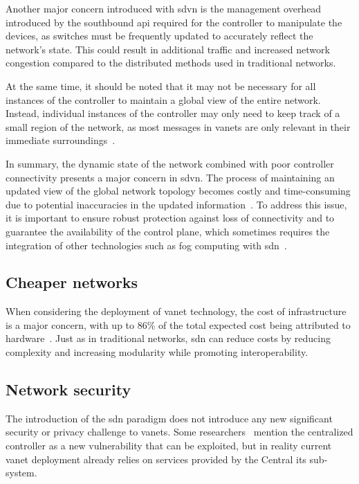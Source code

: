 Another major concern introduced with \gls{sdvn} is the management overhead introduced by the southbound \gls{api} required for the controller to manipulate the devices, as switches must be frequently updated to accurately reflect the network's state. This could result in additional traffic and increased network congestion compared to the distributed methods used in traditional networks.

At the same time, it should be noted that it may not be necessary for all instances of the controller to maintain a global view of the entire network. Instead, individual instances of the controller may only need to keep track of a small region of the network, as most messages in \glspl{vanet} are only relevant in their immediate surroundings~\cite{sarpong_potential_2023}.

In summary, the dynamic state of the network combined with poor controller connectivity presents a major concern in \gls{sdvn}. The process of maintaining an updated view of the global network topology becomes costly and time-consuming due to potential inaccuracies in the updated information~\cite{ben_jaballah_security_2020}. To address this issue, it is important to ensure robust protection against loss of connectivity and to guarantee the availability of the control plane, which sometimes requires the integration of other technologies such as fog computing with \gls{sdn}~\cite{ben_jaballah_security_2020}.

\subsection{Cheaper networks}

When considering the deployment of \gls{vanet} technology, the cost of infrastructure is a major concern, with up to 86\% of the total expected cost being attributed to hardware~\cite{asselin-miller_study_2016}. Just as in traditional networks, \gls{sdn} can reduce costs by reducing complexity and increasing modularity while promoting interoperability.

\subsection{Network security}

The introduction of the \gls{sdn} paradigm does not introduce any new significant security or privacy challenge to \glspl{vanet}. Some researchers~\cite{ben_jaballah_security_2020} mention the centralized controller as a new vulnerability that can be exploited, but in reality current \gls{vanet} deployment already relies on services provided by the Central \gls{its} sub-system.

